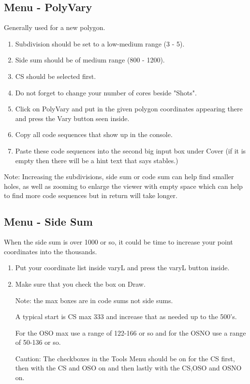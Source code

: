\documentclass[11pt]{report}
\begin{document}
\subsection{Menu - PolyVary}
Generally used for a new polygon. 
\begin{enumerate}[Step 1.]
  \item Subdivision should be set to a low-medium range (3 - 5). 
  \item Side sum should be of medium range (800 - 1200). 
  \item CS should be selected first.
  \item Do not forget to change your number of cores beside "Shots".
  \item Click on PolyVary and put in the given polygon coordinates appearing there and press the Vary button 
  seen inside.
  \item Copy all code sequences that show up in the console.
  \item Paste these code sequences into the second big input box under Cover (if it is empty then there will be a
  hint text that says stables.)
\end{enumerate}

  Note: Increasing the subdivisions, side sum or code sum can help find smaller holes, as well as zooming to
enlarge the viewer with empty space which can help to find more
code sequences but in return will take longer.
\subsection{Menu - Side Sum}
When the side sum is over 1000 or so, it could be time to increase your point coordinates into the
thousands. 
\begin{enumerate}[Step 1.]
  \item Put your coordinate list inside varyL and press the varyL button inside.
  \item Make sure that you check the box on Draw. 
  
  Note: the max boxes are in code sums not side sums. 
  
  A typical start is CS max 333 and increase that as needed up to the 500's.

  For the OSO max use a range of 122-166 or so and for the OSNO use a range of 50-136 or so. 

  Caution:
  The checkboxes in the Tools Menu should be on for the CS first, then with the CS and OSO on and then
  lastly with the CS,OSO and OSNO on.
\end{enumerate} 
\end{document}
